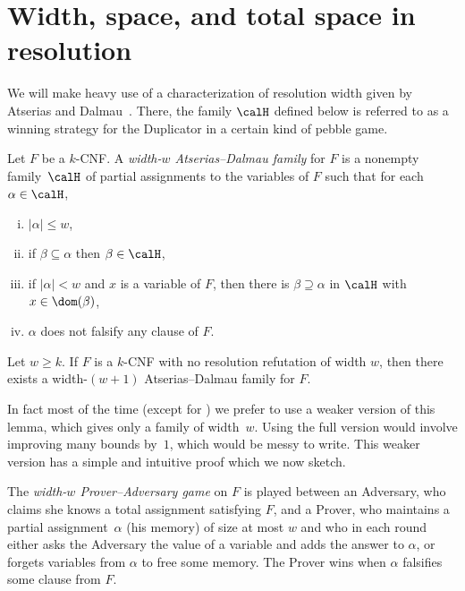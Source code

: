 \documentclass{toc}
\begin{document}
%
\section{Width, space, and total space in resolution}
%
\label{sec:totalspace}

We will make heavy use of a characterization of resolution width
given by Atserias and Dalmau~\cite{DBLP:journals/jcss/AtseriasD08}.  
There, the family $\calH$ defined below
is referred to as a winning strategy for the Duplicator in a certain kind of pebble game.

\begin{definition} \label{def:AD_family}
Let $F$ be a $k$-CNF. A \emph{width-$w$ Atserias--Dalmau family} for $F$ 
is a nonempty family~$\calH$ of partial assignments to the variables of $F$ such that
for each $\alpha \in \calH$,
\begin{enumerate}[(i)]
\item 
$|\alpha| \le w$,
\item 
if  $\beta \subseteq \alpha$ then $\beta \in \calH$,
\item 
if $|\alpha|< w$ and $x$ is a variable of $F$, then there is 
$\beta \supseteq \alpha$ in $\calH$ with $x \in \dom(\beta)$,
\item\label{def-item:ad-soundness} 
$\alpha$ does not falsify any clause of $F$.
\end{enumerate}
\end{definition}

\begin{lemma}
\label{lem:atserias--dalmau}
Let $w \ge k$. If $F$ is a $k$-CNF with no resolution refutation of width $w$, then there exists
a width-$(w+1)$ Atserias--Dalmau family for $F$.
\end{lemma}

In fact most of the time (except for 
) we prefer to use
a weaker version of this lemma, which gives only
a family of width~$w$. Using the full version 
would involve improving many bounds by~$1$, which would
be messy to  write. 
This weaker version has a simple and intuitive proof which
we now sketch.

The \emph{width-$w$ Prover--Adversary game} on $F$
is played between an Adversary,
who claims she knows a  total assignment satisfying $F$, and 
a Prover, who maintains a partial assignment~$\alpha$ (his memory)
of size at most $w$
and who in each round either asks the Adversary the value of a variable
and adds the answer to $\alpha$, or forgets variables from $\alpha$
to free some memory. 
The Prover wins when $\alpha$ falsifies some clause from $F$.
\end{document}
